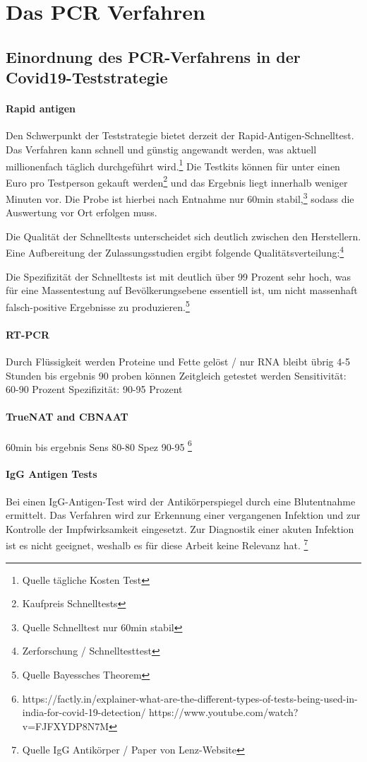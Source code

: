 \chapter{Das PCR Verfahren}
\section{Einordnung des PCR-Verfahrens in der Covid19-Teststrategie}
\subsubsection{Rapid antigen}
Den Schwerpunkt der Teststrategie bietet derzeit der Rapid-Antigen-Schnelltest.
Das Verfahren kann schnell und günstig angewandt werden, was aktuell millionenfach täglich durchgeführt wird.\footnote{Quelle tägliche Kosten Test}
Die Testkits können für unter einen Euro pro Testperson gekauft werden\footnote{Kaufpreis Schnelltests}
und das Ergebnis liegt innerhalb weniger Minuten vor.
Die Probe ist hierbei nach Entnahme nur 60min stabil,\footnote{Quelle Schnelltest nur 60min stabil}
sodass die Auswertung vor Ort erfolgen muss.

Die Qualität der Schnelltests unterscheidet sich deutlich zwischen den Herstellern.
Eine Aufbereitung der Zulassungsstudien ergibt folgende Qualitätsverteilung:\footnote{Zerforschung / Schnelltesttest}

Die Spezifizität der Schnelltests ist mit deutlich über 99 Prozent sehr hoch, was für eine Massentestung auf Bevölkerungsebene essentiell ist, um nicht massenhaft falsch-positive Ergebnisse zu produzieren.\footnote{Quelle Bayessches Theorem}

\subsubsection{RT-PCR}
Durch Flüssigkeit werden Proteine und Fette gelöst / nur RNA bleibt übrig
4-5 Stunden bis ergebnis
90 proben können Zeitgleich getestet werden
Sensitivität: 60-90 Prozent
Spezifizität: 90-95 Prozent

\subsubsection{TrueNAT and CBNAAT}
60min bis ergebnis
Sens 80-80
Spez 90-95
\footnote{https://factly.in/explainer-what-are-the-different-types-of-tests-being-used-in-india-for-covid-19-detection/  https://www.youtube.com/watch?v=FJFXYDP8N7M}

\subsubsection{IgG Antigen Tests}
Bei einen IgG-Antigen-Test wird der Antikörperspiegel durch eine Blutentnahme ermittelt.
Das Verfahren wird zur Erkennung einer vergangenen Infektion und zur Kontrolle der Impfwirksamkeit eingesetzt.
Zur Diagnostik einer akuten Infektion ist es nicht geeignet, weshalb es für diese Arbeit keine Relevanz hat.
\footnote{Quelle IgG Antikörper / Paper von Lenz-Website}

